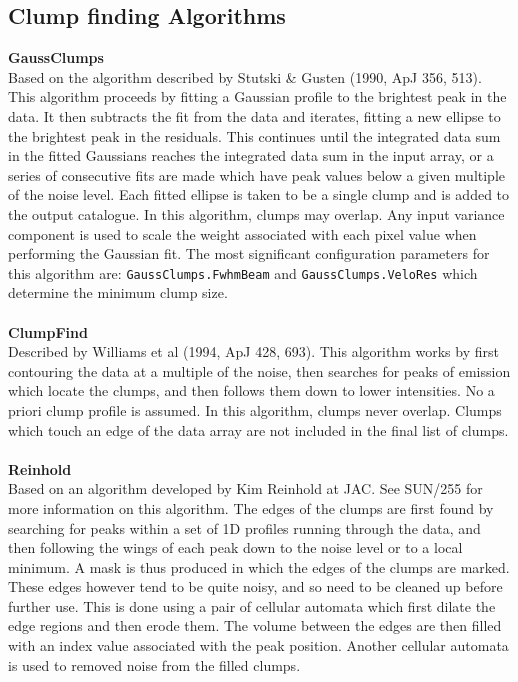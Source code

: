 \documentclass[twoside,11pt]{article}
\newcommand{\xlabel}[1]{}
\renewcommand{\_}{\texttt{\symbol{95}}}
\newcommand{\param}[1]{\texttt{#1}}
\begin{document}
\newpage
\subsection{\xlabel{clumpfind}Clump finding Algorithms}
\label{app:clumpfind}

\textbf{GaussClumps}\\Based on the algorithm described by Stutski \& Gusten (1990, ApJ 356, 513). This algorithm proceeds by fitting a Gaussian profile to the brightest peak in the data. It then subtracts the fit from the data and iterates, fitting a new ellipse to the brightest peak in the residuals. This continues until the integrated data sum in the fitted Gaussians reaches the integrated data sum in the input array, or a series of consecutive fits are made which have peak values below a given multiple of the noise level. Each fitted ellipse is taken to be a single clump and is added to the output catalogue. In this algorithm, clumps may overlap. Any input variance component is used to scale the weight associated with each pixel value when performing the Gaussian fit. The most significant configuration parameters for this algorithm are: \param{GaussClumps.FwhmBeam} and \param{GaussClumps.VeloRes} which determine the minimum clump size.
\\\\
\textbf{ClumpFind}\\
Described by Williams et al (1994, ApJ 428, 693). This algorithm works by first contouring the data at a multiple of the noise, then searches for peaks of emission which locate the clumps, and then follows them down to lower intensities. No a priori clump profile is assumed. In this algorithm, clumps never overlap. Clumps which touch an edge of the data array are not included in the final list of clumps.
\\\\
 \textbf{Reinhold}\\
 Based on an algorithm developed by Kim Reinhold at JAC. See SUN/255 for more information on this algorithm. The edges of the clumps are first found by searching for peaks within a set of 1D profiles running through the data, and then following the wings of each peak down to the noise level or to a local minimum. A mask is thus produced in which the edges of the clumps are marked. These edges however tend to be quite noisy, and so need to be cleaned up before further use. This is done using a pair of cellular automata which first dilate the edge regions and then erode them. The volume between the edges are then filled with an index value associated with the peak position. Another cellular automata is used to removed noise from the filled clumps.
\end{document}
